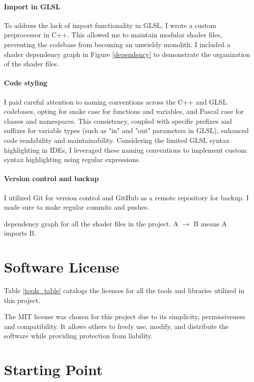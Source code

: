 \paragraph{Import in GLSL}
To address the lack of import functionality in GLSL, I wrote a custom preprocessor in C++. This allowed me to maintain modular shader files, preventing the codebase from becoming an unwieldy monolith. I included a shader dependency graph in Figure \ref{dependency} to demonstrate the organization of the shader files.

\paragraph{Code styling}
I paid careful attention to naming conventions across the C++ and GLSL codebases, opting for snake case for functions and variables, and Pascal case for classes and namespaces. This consistency, coupled with specific prefixes and suffixes for variable types (such as "in" and "out" parameters in GLSL), enhanced code readability and maintainability. Considering the limited GLSL syntax highlighting in IDEs, I leveraged these naming conventions to implement custom syntax highlighting using regular expressions.

\paragraph{Version control and backup}
I utilized Git for version control and GitHub as a remote repository for backup. I made sure to make regular commits and pushes.

{dependency graph for all the shader files in the project. A $\rightarrow$ B means A imports B.}

\section{Software License}
\label{sec:License}

Table \ref{tools_table} catalogs the licenses for all the tools and libraries utilized in this project.

The MIT license was chosen for this project due to its simplicity, permissiveness and compatibility. It allows others to freely use, modify, and distribute the software while providing protection from liability.


\section{Starting Point}
\label{sec:Starting Point}

